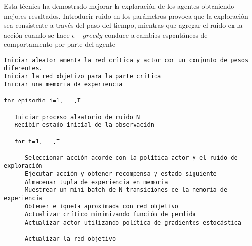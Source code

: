 \documentclass[11pt,fleqn]{book} %
\begin{document}
Esta técnica ha demostrado mejorar la exploración de los agentes obteniendo mejores resultados. Introducir ruido en los parámetros provoca que la exploración sea consistente a través del paso del tiempo, mientras que agregar el ruido en la acción cuando se hace $\epsilon-greedy$ conduce a cambios espontáneos de comportamiento por parte del agente. \\

%
%	
%	
%
%

\begin{verbatim}
Iniciar aleatoriamente la red crítica y actor con un conjunto de pesos diferentes.
Iniciar la red objetivo para la parte crítica
Iniciar una memoria de experiencia

for episodio i=1,...,T

   Iniciar proceso aleatorio de ruido N 
   Recibir estado inicial de la observación
   
   for t=1,...,T
   
      Seleccionar acción acorde con la política actor y el ruido de exploración
      Ejecutar acción y obtener recompensa y estado siguiente
      Almacenar tupla de experiencia en memoria
      Muestrear un mini-batch de N transiciones de la memoria de experiencia
      Obtener etiqueta aproximada con red objetivo
      Actualizar crítico minimizando función de perdida
      Actualizar actor utilizando política de gradientes estocástica
      
      Actualizar la red objetivo

\end{verbatim}
\end{document}

